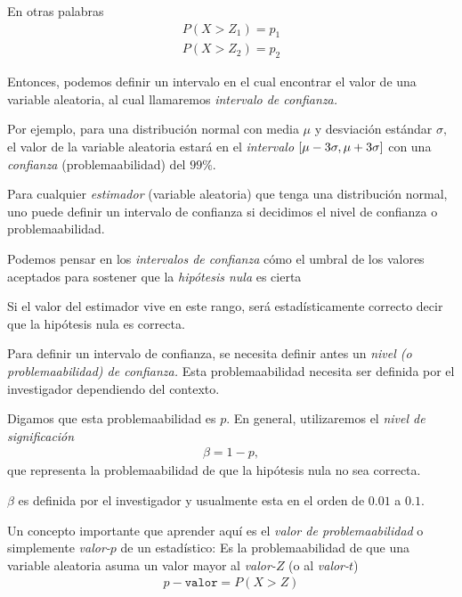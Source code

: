 En otras palabras
\begin{align}
 P(X>Z_{1})=p_{1}\\
 P(X>Z_{2})=p_{2}
\end{align}



Entonces, podemos definir un intervalo en el cual encontrar el valor de una variable aleatoria, al cual llamaremos \emph{intervalo de confianza.}


Por ejemplo, para una distribución normal con media $\mu$ y desviación estándar $\sigma,$ el valor de la variable aleatoria estará en el \emph{intervalo} $[\mu-3\sigma,\mu+3\sigma]$ con una \emph{confianza} (problemaabilidad) del $99\%.$


Para cualquier \emph{estimador} (variable aleatoria) que tenga una distribución normal, uno puede definir un intervalo de confianza si decidimos el nivel de confianza o problemaabilidad.


Podemos pensar en los \emph{intervalos de confianza} cómo el umbral de los valores aceptados para sostener que la \emph{hipótesis nula} es cierta


Si el valor del estimador vive en este rango, será estadísticamente correcto decir que la hipótesis nula es correcta.


Para definir un intervalo de confianza, se necesita definir antes un \emph{nivel (o problemaabilidad) de confianza.}  Esta problemaabilidad necesita ser definida por el investigador dependiendo del contexto.


Digamos que esta problemaabilidad es $p$. En general, utilizaremos el \emph{nivel de significación}
\begin{align}
 \beta = 1-p,
\end{align}
que representa la problemaabilidad de que la hipótesis nula no sea correcta. 

$\beta$ es definida por el investigador y usualmente esta en el orden de $0.01$ a $0.1$.



 Un concepto importante que aprender aquí es el \emph{valor de problemaabilidad} o simplemente \emph{valor-}$p$ de un estadístico:  Es la problemaabilidad de que una variable aleatoria asuma un valor mayor al \emph{valor-}$Z$ (o al \emph{valor-}$t$)
 \begin{align}
  p-\texttt{valor}=P\left( X>Z \right)
 \end{align}



